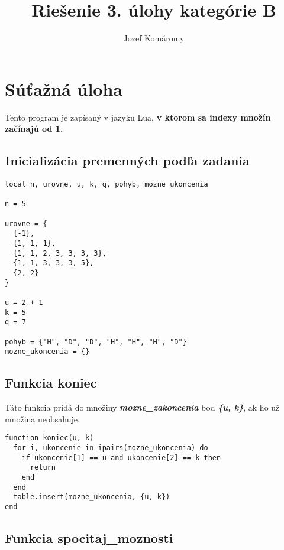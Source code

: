 \documentclass{article}
\begin{document}
\title{Riešenie 3. úlohy kategórie B}
\author{Jozef Komáromy}

\maketitle


\section{Súťažná úloha}

Tento program je zapísaný v jazyku Lua, \textbf{v ktorom sa indexy množín začínajú od 1}.


\subsection{Inicializácia premenných podľa zadania}

\begin{lstlisting}
local n, urovne, u, k, q, pohyb, mozne_ukoncenia

n = 5

urovne = {
  {-1},
  {1, 1, 1},
  {1, 1, 2, 3, 3, 3, 3},
  {1, 1, 3, 3, 3, 5},
  {2, 2}
}

u = 2 + 1
k = 5
q = 7

pohyb = {"H", "D", "D", "H", "H", "H", "D"}
mozne_ukoncenia = {}
\end{lstlisting}

\subsection{Funkcia koniec}


Táto funkcia pridá do množiny \textbf{\textit{mozne\_zakoncenia}} bod \textbf{\textit{\{u, k\}}}, ak ho už množina neobsahuje.


\begin{lstlisting}
function koniec(u, k)
  for i, ukoncenie in ipairs(mozne_ukoncenia) do
    if ukoncenie[1] == u and ukoncenie[2] == k then
      return
    end
  end
  table.insert(mozne_ukoncenia, {u, k})
end
\end{lstlisting}

\subsection{Funkcia spocitaj\_moznosti}
\end{document}
